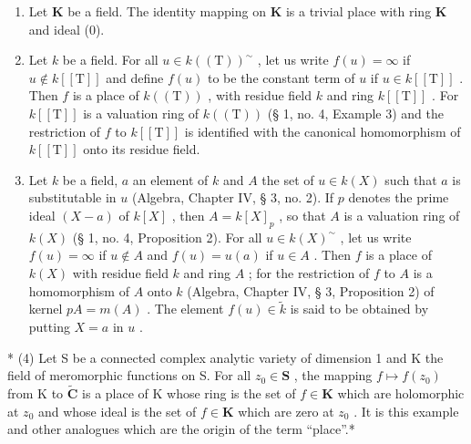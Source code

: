\begin{enumerate}
\def\labelenumi{(\arabic{enumi})}
\item
  Let \(\mathbf{K}\) be a field. The identity mapping on \(\mathbf{K}\) is a trivial place with ring \(\mathbf{K}\) and ideal (0).
\item
  Let \(k\) be a field. For all \(u \in k((\mathrm{T}))^{\sim}\) , let us write \(f(u) = \infty\) if \(u \notin k[[\mathrm{T}]]\) and define \(f(u)\) to be the constant term of \(u\) if \(u \in k[[\mathrm{T}]]\) . Then \(f\) is a place of \(k((\mathrm{T}))\) , with residue field \(k\) and ring \(k[[\mathrm{T}]]\) . For \(k[[\mathrm{T}]]\) is a valuation ring of \(k((\mathrm{T}))\) (§ 1, no. 4, Example 3) and the restriction of \(f\) to \(k[[\mathrm{T}]]\) is identified with the canonical homomorphism of \(k[[\mathrm{T}]]\) onto its residue field.
\item
  Let \(k\) be a field, \(a\) an element of \(k\) and \(A\) the set of \(u \in k(X)\) such that \(a\) is substitutable in \(u\) (Algebra, Chapter IV, § 3, no. 2). If \(p\) denotes the prime ideal \((X - a)\) of \(k[X]\) , then \(A = k[X]_p\) , so that \(A\) is a valuation ring of \(k(X)\) (§ 1, no. 4, Proposition 2). For all \(u \in k(X)^{\sim}\) , let us write \(f(u) = \infty\) if \(u \notin A\) and \(f(u) = u(a)\) if \(u \in A\) . Then \(f\) is a place of \(k(X)\) with residue field \(k\) and ring \(A\) ; for the restriction of \(f\) to \(A\) is a homomorphism of \(A\) onto \(k\) (Algebra, Chapter IV, § 3, Proposition 2) of kernel \(pA = m(A)\) . The element \(f(u) \in \tilde{k}\) is said to be obtained by putting \(X = a\) in \(u\) .
\end{enumerate}

* (4) Let S be a connected complex analytic variety of dimension 1 and K the field of meromorphic functions on S. For all \(z_0 \in \mathbf{S}\) , the mapping \(f \mapsto f(z_0)\) from K to \(\tilde{\mathbf{C}}\) is a place of K whose ring is the set of \(f \in \mathbf{K}\) which are holomorphic at \(z_0\) and whose ideal is the set of \(f \in \mathbf{K}\) which are zero at \(z_0\) . It is this example and other analogues which are the origin of the term ``place''.*

